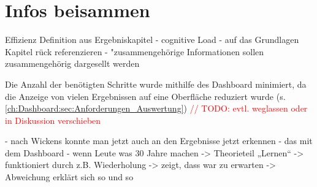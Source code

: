 \section{Infos beisammen}
Effizienz Definition aus Ergebniskapitel - cognitive Load - auf das Grundlagen Kapitel rück referenzieren - "zusammengehörige Informationen sollen zusammengehörig dargesellt werden

Die Anzahl der benötigten Schritte wurde mithilfe des Dashboard minimiert, da die Anzeige von vielen Ergebnissen auf eine Oberfläche reduziert wurde (s. \autoref{ch:Dashboard:sec:Anforderungen_Auswertung})   \textcolor{red}{// TODO: evtl. weglassen oder in Diskussion verschieben}

-	nach Wickens konnte man jetzt auch an den Ergebnisse jetzt erkennen - das mit dem Dashboard
-	wenn Leute was 30 Jahre machen
-> Theorieteil „Lernen“
-> funktioniert durch z.B. Wiederholung
-> zeigt, dass war zu erwarten
-> Abweichung erklärt sich so und so